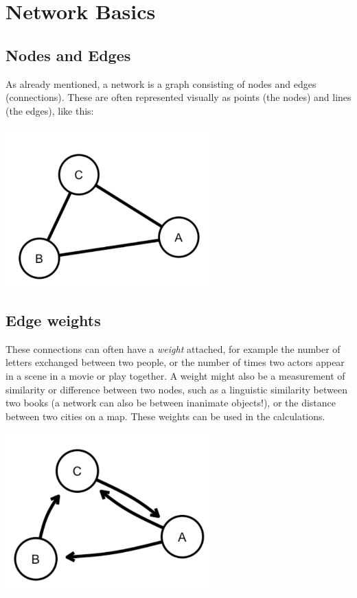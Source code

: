\documentclass[
]{book}
\begin{document}
\hypertarget{network-basics}{%
\section{Network Basics}\label{network-basics}}

\hypertarget{nodes-and-edges}{%
\subsection{Nodes and Edges}\label{nodes-and-edges}}

As already mentioned, a network is a graph consisting of nodes and edges (connections). These are often represented visually as points (the nodes) and lines (the edges), like this:

\includegraphics[width=3.125in,height=\textheight]{images/Screenshot 2022-09-26 at 11.42.32.png}

\hypertarget{edge-weights}{%
\subsection{Edge weights}\label{edge-weights}}

These connections can often have a \emph{weight} attached, for example the number of letters exchanged between two people, or the number of times two actors appear in a scene in a movie or play together. A weight might also be a measurement of similarity or difference between two nodes, such as a linguistic similarity between two books (a network can also be between inanimate objects!), or the distance between two cities on a map. These weights can be used in the calculations.

\includegraphics[width=3.125in,height=\textheight]{images/Screenshot 2022-09-26 at 11.42.58.png}
\end{document}
